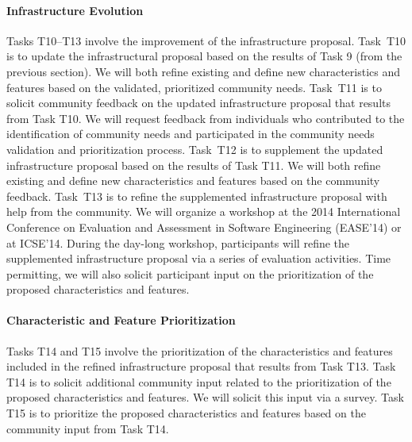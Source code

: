 \paragraph{Infrastructure Evolution}
Tasks T10--T13 involve the improvement of the infrastructure proposal.
Task~T10 is to update the infrastructural proposal based on the results of Task 9 (from the previous section).
We will both refine existing and define new characteristics and features based on the validated, prioritized community needs.
Task~T11 is to solicit community feedback on the updated infrastructure proposal that results from Task T10.
We will request feedback from individuals who contributed to the identification of community needs and
participated in the community needs validation and prioritization process.
Task~T12 is to supplement the updated infrastructure proposal based on the results of Task T11.
We will both refine existing and define new characteristics and features based on the community feedback.
Task~T13 is to refine the supplemented infrastructure proposal with help from the community.
We will organize a workshop at the 2014 International Conference on Evaluation and Assessment in Software Engineering (EASE'14) or at ICSE'14.
During the day-long workshop, participants will refine the supplemented infrastructure proposal via a series of evaluation activities.
Time permitting, we will also solicit participant input on the prioritization of the proposed characteristics and features.

\paragraph{Characteristic and Feature Prioritization}
Tasks T14 and T15 involve the prioritization of the characteristics and features included in the refined infrastructure proposal
that results from Task T13.
Task T14 is to solicit additional community input related to the prioritization of the proposed characteristics and features.
We will solicit this input via a survey.
Task T15 is to prioritize the proposed characteristics and features based on the community input from Task T14.

